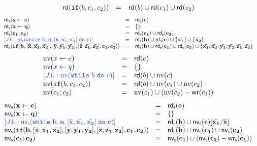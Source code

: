 \documentclass[a4paper,11pt]{article}
\begin{document}
\begin{defn}
\[\begin{array}{lll}
    \mathsf{rd} (\mathtt{if}(b, c_1, c_2)) & =& \mathsf{rd} (b) \cup \mathsf{rd} (c_1) \cup \mathsf{rd} (c_2)\\
\end{array}
\]
\[
\begin{array}{lll}
    \varssa{\ssa{\assign{x}{\expr}}} & =& \varssa{\ssa{\expr}}  \\
    \varssa{\ssa{\assign{x}{q}}} & =& \{  \} \\
    \varssa{ \ssa{c_1; c_2}  }  & = & \varssa{\ssa{c_1}} \cup \varssa{\ssa{c_2}} \\
    \jl{\varssa{  \ewhile ~ \ssa{\bexpr, n, [\bar{x}, \bar{x_1}, \bar{x_2}] ~ \edo ~ c} }} 
    &= &
    \varssa{\ssa{\bexpr}} \cup \varssa{\ssa{c}}  \cup \{ \ssa{\bar{x_1}} \} \cup \{ \ssa{\bar{x_2}} \}\\
    \varssa{\eif(\ssa{\bexpr,[\bar{x}, \bar{x_1}, \bar{x_2}], [\bar{y}, \bar{y_1}, \bar{y_2}],[\bar{z}, \bar{z_1}, \bar{z_2}], c_1, c_2} )} & =& \varssa{\ssa{\bexpr}} \cup \varssa{\ssa{c_1}} \cup \varssa{\ssa{c_2}} \cup \{\ssa{\bar{x_1}, \bar{x_2},\bar{y_1}, \bar{y_2},\bar{z_1}, \bar{z_2} }\}  \\
\end{array}
\]
 \[
 \begin{array}{lll}
     \fvars{\assign{x}{\expr} }  & = & \vars{\expr}  \\
     \fvars{\assign{x}{q} }  & = & \{ \}  \\
     \jl{\fvars{  \ewhile ~ \bexpr ~ \edo ~ c  } }&= & \vars{\bexpr} \cup \fvars{c} \\
     \fvars{\eif(\bexpr, c_1, c_2)} & =& \vars{\bexpr} \cup \fvars{c_1} \cup \fvars{c_2}  \\
      \fvars{c_1 ; c_2} & = & \fvars{c_1} \cup ( \fvars{c_2} - \avars{c_1})
 \end{array}
 \]
 \[
 \begin{array}{lll}
     \fvssa{\ssa{\assign{x}{\expr}} }  & = & \varssa{\ssa{\expr}}  \\
     \fvssa{ \ssa{ \assign{x}{q}} }  & = & \{ \}  \\
     \jl{\fvssa{  \ewhile ~ \ssa{\bexpr, n, [\bar{x}, \bar{x_1}, \bar{x_2}] ~ \edo ~ c} } }
     &= & 
     \varssa{\ssa{\bexpr}} \cup \fvssa{\ssa{c}}[\ssa{ \bar{x_1}} / \ssa{\bar{x}}]\\
     \fvssa{\eif(\ssa{\bexpr,[\bar{x}, \bar{x_1}, \bar{x_2}],[\bar{y}, \bar{y_1}, \bar{y_2}],[\bar{z}, \bar{z_1}, \bar{z_2}], c_1, c_2} )} & =& \varssa{\ssa{\bexpr}} \cup \fvssa{\ssa{c_1}} \cup \fvssa{\ssa{c_2}}  \\
      \fvssa{\ssa{c_1 ; c_2}} & = & \fvssa{\ssa{c_1}} \cup ( \fvssa{\ssa{c_2}} - \avarssa{\ssa{c_1}})
 \end{array}
 \]
 
 
\end{defn}
\end{document}
